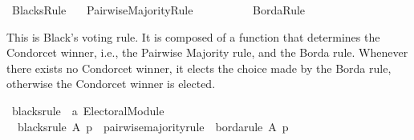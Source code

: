 %
\begin{isabellebody}%
%
%
\isadelimdocument
\isanewline
%
\endisadelimdocument
%
\isatagdocument
\isanewline
%
\isamarkuptrue%
%
\endisatagdocument
{\isafolddocument}%
%
\isadelimdocument
%
\endisadelimdocument
%
\isadelimtheory
%
\endisadelimtheory
%
\isatagtheory
{}\isamarkupfalse%
\ Blacks{\isacharunderscore}{\kern0pt}Rule\isanewline
\ \ \ Pairwise{\isacharunderscore}{\kern0pt}Majority{\isacharunderscore}{\kern0pt}Rule\isanewline
\ \ \ \ \ \ \ \ \ \ Borda{\isacharunderscore}{\kern0pt}Rule\isanewline
{}%
\endisatagtheory
{\isafoldtheory}%
%
\isadelimtheory
%
\endisadelimtheory
%
\begin{isamarkuptext}%
This is Black's voting rule. It is composed of a function that determines
the Condorcet winner, i.e., the Pairwise Majority rule, and the Borda rule.
Whenever there exists no Condorcet winner, it elects the choice made by the
Borda rule, otherwise the Condorcet winner is elected.%
\end{isamarkuptext}\isamarkuptrue%
%
\isadelimdocument
%
\endisadelimdocument
%
\isatagdocument
%
\isamarkuptrue%
%
\endisatagdocument
{\isafolddocument}%
%
\isadelimdocument
%
\endisadelimdocument
{}\isamarkupfalse%
\ blacks{\isacharunderscore}{\kern0pt}rule\ {\isacharcolon}{\kern0pt}{\isacharcolon}{\kern0pt}\ {\isachardoublequoteopen}{\isacharprime}{\kern0pt}a\ Electoral{\isacharunderscore}{\kern0pt}Module{\isachardoublequoteclose}\ \isanewline
\ \ {\isachardoublequoteopen}blacks{\isacharunderscore}{\kern0pt}rule\ A\ p\ {\isacharequal}{\kern0pt}\ {\isacharparenleft}{\kern0pt}pairwise{\isacharunderscore}{\kern0pt}majority{\isacharunderscore}{\kern0pt}rule\ {\isasymtriangleright}\ borda{\isacharunderscore}{\kern0pt}rule{\isacharparenright}{\kern0pt}\ A\ p{\isachardoublequoteclose}\isanewline
%
\isadelimtheory
\isanewline
%
\endisadelimtheory
%
\isatagtheory
{}\isamarkupfalse%
%
\endisatagtheory
{\isafoldtheory}%
%
\isadelimtheory
%
\endisadelimtheory
%
\end{isabellebody}%
\endinput
